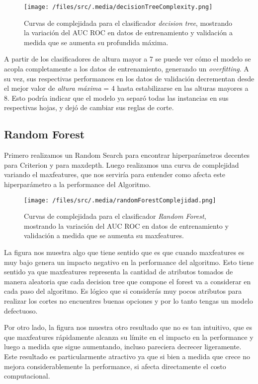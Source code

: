 \begin{figure}[!htbp]
    \centering
    \texttt{[image: /files/src/.media/decisionTreeComplexity.png]}
    \caption{Curvas de complejidada para el clasificador \textit{decision tree}, mostrando la variación del AUC ROC en datos de entrenamiento y validación a medida que se aumenta su profundida máxima.}
    \label{SVMComplexity}
\end{figure}

A partir de los clasificadores de altura mayor a 7 se puede ver cómo el modelo se  acopla completamente a los datos de entrenamiento, generando un \textit{overfitting}. A su vez, sus respectivas performances en los datos de validación decrementan desde el mejor valor de \textit{altura máxima} = 4 hasta estabilizarse en las alturas mayores a 8. Esto podría indicar que el modelo ya separó todas las instancias en sus respectivas hojas, y dejó de cambiar sus reglas de corte. 

\subsection{Random Forest}

Primero realizamos un Random Search para encontrar hiperparámetros decentes para Criterion y para maxdepth. Luego realizamos una curva de complejidad variando el maxfeatures, que nos serviría para entender como afecta este hiperparámetro a la performance del Algoritmo. 

\begin{figure}[!htbp]
    \centering
    \texttt{[image: /files/src/.media/randomForestComplejidad.png]}
    \caption{Curvas de complejidada para el clasificador \textit{Random Forest}, mostrando la variación del AUC ROC en datos de entrenamiento y validación a medida que se aumenta su maxfeatures.}
    \label{RFComplexity}
\end{figure}



La figura nos muestra algo que tiene sentido que es que cuando maxfeatures es muy bajo genera un impacto negativo en la performance del algoritmo. Esto tiene sentido ya que maxfeatures representa la cantidad de atributos tomados de manera aleatoria que cada decision tree que compone el forest va a considerar en cada paso del algoritmo. Es lógico que si considerás muy pocos atributos para realizar los cortes no encuentres buenas opciones y por lo tanto tengas un modelo defectuoso.

Por otro lado, la figura nos muestra otro resultado que no es tan intuitivo, que es que maxfeatures rápidamente alcanza su límite en el impacto en la performance y luego a medida que sigue aumentando, incluso pareciera decrecer ligeramente. Este resultado es particularmente atractivo ya que si bien a medida que crece no mejora considerablemente la performance, si afecta directamente el costo computacional. 

